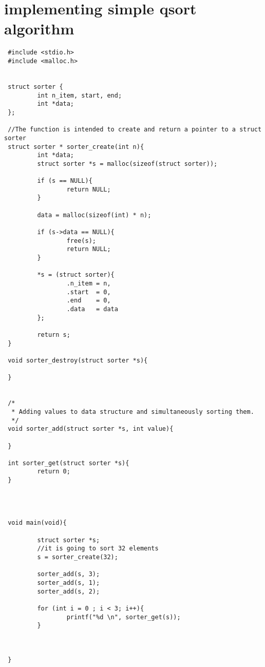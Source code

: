 \section{implementing simple qsort algorithm}

\begin{lstlisting}
 #include <stdio.h>
 #include <malloc.h>


 struct sorter {
         int n_item, start, end;
         int *data;
 };

 //The function is intended to create and return a pointer to a struct sorter
 struct sorter * sorter_create(int n){
         int *data;
         struct sorter *s = malloc(sizeof(struct sorter));

         if (s == NULL){
                 return NULL;
         }

         data = malloc(sizeof(int) * n);

         if (s->data == NULL){
                 free(s);
                 return NULL;
         }

         *s = (struct sorter){
                 .n_item = n,
                 .start  = 0,
                 .end    = 0,
                 .data   = data
         };

         return s;
 }

 void sorter_destroy(struct sorter *s){

 }


 /*
  * Adding values to data structure and simultaneously sorting them.
  */
 void sorter_add(struct sorter *s, int value){

 }

 int sorter_get(struct sorter *s){
         return 0;
 }




 void main(void){

         struct sorter *s;
         //it is going to sort 32 elements
         s = sorter_create(32);

         sorter_add(s, 3);
         sorter_add(s, 1);
         sorter_add(s, 2);

         for (int i = 0 ; i < 3; i++){
                 printf("%d \n", sorter_get(s));
         }



 }
\end{lstlisting}

